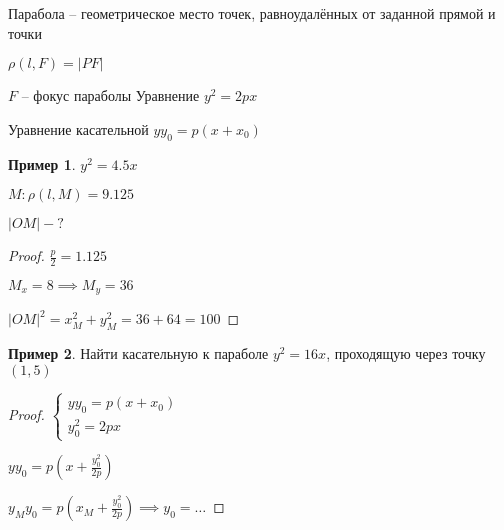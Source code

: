 \documentclass{book}
\theoremstyle{definition}
\newtheorem*{example}{Пример}
\newcommand{\incfig}[1]{%
    \def\svgwidth{\columnwidth}
    {#1.pdf_tex}
}
\begin{document}
\begin{definition}
    Парабола -- геометрическое место точек, равноудалённых от заданной прямой и точки

    $\rho(l, F) = |PF|$


$F$ -- фокус параболы
Уравнение  $y^2 = 2px$

Уравнение касательной $yy_0 = p(x+x_0)$
\end{definition}

\begin{example}
    $y^2 = 4.5 x$

    $M: \rho(l, M) = 9.125$

     $\left| OM \right| -?$
\end{example}
\begin{proof}
    $\frac{p}{2} = 1.125$ 

    $M_x = 8\implies M_y = 36$

    $\left| OM \right|^2 = x_M^2 + y_M^2 = 36+64 =100 $
\end{proof}
\begin{example}
    Найти касательную к параболе $y^2 = 16x$, проходящую через точку $(1,5)$
\end{example}
\begin{proof}
    $\begin{cases}
        yy_0 = p(x+x_0)\\
        y_0^2 = 2px
    \end{cases}$ 

    $yy_0 = p\left( x + \frac{y_0^2}{2p} \right) $

    $y_My_0 = p\left( x_M + \frac{y_0^2}{2p} \right) \implies y_0 = \ldots$
\end{proof}
\end{document}
